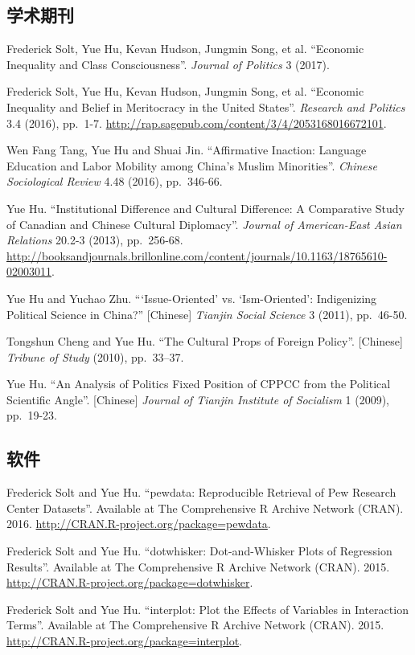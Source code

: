 \documentclass[10.5pt,]{article}
\begin{document}
\subsection{学术期刊}

Frederick Solt, Yue Hu, Kevan Hudson, Jungmin Song, et al. ``Economic
Inequality and Class Consciousness''. \emph{Journal of Politics} 3
(2017).

Frederick Solt, Yue Hu, Kevan Hudson, Jungmin Song, et al. ``Economic
Inequality and Belief in Meritocracy in the United States''.
\emph{Research and Politics} 3.4 (2016), pp.~1-7.
\url{http://rap.sagepub.com/content/3/4/2053168016672101}.

Wen Fang Tang, Yue Hu and Shuai Jin. ``Affirmative Inaction: Language
Education and Labor Mobility among China's Muslim Minorities''.
\emph{Chinese Sociological Review} 4.48 (2016), pp.~346-66.

Yue Hu. ``Institutional Difference and Cultural Difference: A
Comparative Study of Canadian and Chinese Cultural Diplomacy''.
\emph{Journal of American-East Asian Relations} 20.2-3 (2013),
pp.~256-68.
\url{http://booksandjournals.brillonline.com/content/journals/10.1163/18765610-02003011}.

Yue Hu and Yuchao Zhu. ```Issue-Oriented' vs. `Ism-Oriented':
Indigenizing Political Science in China?'' {[}Chinese{]}
\emph{Tianjin Social Science} 3 (2011), pp.~46-50.

Tongshun Cheng and Yue Hu. ``The Cultural Props of Foreign Policy''.
{[}Chinese{]} \emph{Tribune of Study} (2010), pp.~33--37.

Yue Hu. ``An Analysis of Politics Fixed Position of CPPCC from the
Political Scientific Angle''. {[}Chinese{]}
\emph{Journal of Tianjin Institute of Socialism} 1 (2009), pp.~19-23.

\subsection{软件}

Frederick Solt and Yue Hu. ``pewdata: Reproducible Retrieval of Pew
Research Center Datasets''. Available at The Comprehensive R Archive
Network (CRAN). 2016. \url{http://CRAN.R-project.org/package=pewdata}.

Frederick Solt and Yue Hu. ``dotwhisker: Dot-and-Whisker Plots of
Regression Results''. Available at The Comprehensive R Archive Network
(CRAN). 2015. \url{http://CRAN.R-project.org/package=dotwhisker}.

Frederick Solt and Yue Hu. ``interplot: Plot the Effects of Variables in
Interaction Terms''. Available at The Comprehensive R Archive Network
(CRAN). 2015. \url{http://CRAN.R-project.org/package=interplot}.
\end{document}
